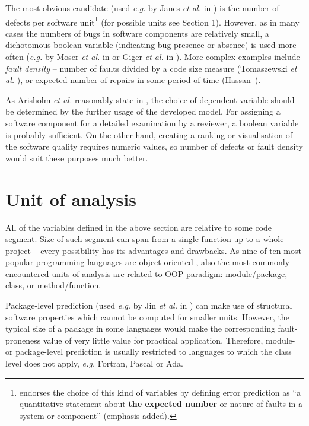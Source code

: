 \documentclass{pracamgr}
\begin{document}
The most obvious candidate (used \textit{e.g.} by Janes \textit{et al.} in \cite{Janes}) is the number of defects per software unit\footnote{\cite[p. 31]{glossary} endorses the choice of this kind of variables by defining error prediction as ``a quantitative statement about \textbf{the expected number} or nature of faults in a system or component'' (emphasis added).} (for possible units see Section \ref{sec:unit_of_analysis}). However, as in many cases the numbers of bugs in software components are relatively small, a dichotomous boolean variable (indicating bug presence or absence) is used more often (\textit{e.g.} by Moser \textit{et al.} in \cite{comparative} or Giger \textit{et al.} in \cite{method-level}). More complex examples include \emph{fault density} -- number of faults divided by a code size measure (Tomaszewski \textit{et al.} \cite{Tomaszewski}), or expected number of repairs in some period of time (Hassan~\cite{complexity}).

As Arisholm \textit{et al.} reasonably state in \cite[p. 5]{systematic}, the choice of dependent variable should be determined by the further usage of the developed model. For assigning a software component for a detailed examination by a reviewer, a boolean variable is probably sufficient. On the other hand, creating a ranking or visualisation of the software quality requires numeric values, so number of defects or fault density would suit these purposes much better.

\section{Unit of analysis}
\label{sec:unit_of_analysis}
All of the variables defined in the above section are relative to some code segment. Size of such segment can span from a single function up to a whole project -- every possibility has its advantages and drawbacks. As nine of ten most popular programming languages are object-oriented \cite{popularity1,popularity2}, also the most commonly encountered units of analysis are related to OOP paradigm: module/package, class, or method/function.

Package-level prediction (used \textit{e.g.} by Jin \textit{et al.} in \cite{Jin}) can make use of structural software properties which cannot be computed for smaller units. However, the typical size of a package in some languages would make the corresponding fault-proneness value of very little value for practical application. Therefore, module- or package-level prediction is usually restricted to languages to which the class level does not apply, \textit{e.g.} Fortran, Pascal or Ada.
\end{document}
